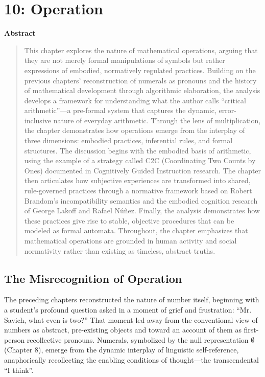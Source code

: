 \documentclass[12pt]{book}
\newenvironment{abstract}
    { %
      \begin{center} %
        \textbf{Abstract} %
      \end{center}
      \vspace{\baselineskip} %
      \begin{quotation} %
      \small %
    }
    { %
      \end{quotation} %
      \bigskip %
    }
\begin{document}
\chapter{10: Operation}

\begin{abstract}
This chapter explores the nature of mathematical operations, arguing that they are not merely formal manipulations of symbols but rather expressions of embodied, normatively regulated practices. Building on the previous chapters' reconstruction of numerals as pronouns and the history of mathematical development through algorithmic elaboration, the analysis develops a framework for understanding what the author calls ``critical arithmetic''---a pre-formal system that captures the dynamic, error-inclusive nature of everyday arithmetic. Through the lens of multiplication, the chapter demonstrates how operations emerge from the interplay of three dimensions: embodied practices, inferential rules, and formal structures. The discussion begins with the embodied basis of arithmetic, using the example of a strategy called C2C (Coordinating Two Counts by Ones) documented in Cognitively Guided Instruction research. The chapter then articulates how subjective experiences are transformed into shared, rule-governed practices through a normative framework based on Robert Brandom's incompatibility semantics and the embodied cognition research of George Lakoff and Rafael Núñez. Finally, the analysis demonstrates how these practices give rise to stable, objective procedures that can be modeled as formal automata. Throughout, the chapter emphasizes that mathematical operations are grounded in human activity and social normativity rather than existing as timeless, abstract truths.
\end{abstract}

\section{The Misrecognition of Operation}

The preceding chapters reconstructed the nature of number itself, beginning with a student's profound question asked in a moment of grief and frustration: \enquote{Mr. Savich, what even is two?} That moment led away from the conventional view of numbers as abstract, pre-existing objects and toward an account of them as first-person recollective pronouns. Numerals, symbolized by the null representation $\emptyset$ (Chapter 8), emerge from the dynamic interplay of linguistic self-reference, anaphorically recollecting the enabling conditions of thought---the transcendental \enquote{I think}.
\end{document}

